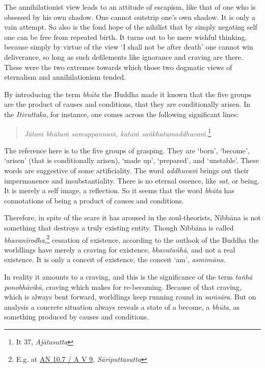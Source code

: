 The annihilationist view leads to an attitude of escapism, like that of one who is obsessed by his own shadow. One cannot outstrip one's own shadow. It is only a vain attempt. So also is the fond hope of the nihilist that by simply negating self one can be free from repeated birth. It turns out to be mere wishful thinking, because simply by virtue of the view `I shall not be after death' one cannot win deliverance, so long as such defilements like ignorance and craving are there. These were the two extremes towards which those two dogmatic views of eternalism and annihilationism tended.

By introducing the term \emph{bhūta} the Buddha made it known that the five groups are the product of causes and conditions, that they are conditionally arisen. In the \emph{Itivuttaka}, for instance, one comes across the following significant lines:

\begin{quote}
\emph{Jātaṁ bhūtaṁ samuppannaṁ, kataṁ saṅkhatamaddhuvaṁ.}\footnote{It 37, \emph{Ajātasutta}}
\end{quote}

The reference here is to the five groups of grasping. They are `born', `become', `arisen' (that is conditionally arisen), `made up', `prepared', and `unstable'. These words are suggestive of some artificiality. The word \emph{addhuvaṁ} brings out their impermanence and insubstantiality. There is no eternal essence, like \emph{sat}, or being. It is merely a self image, a reflection. So it seems that the word \emph{bhūta} has connotations of being a product of causes and conditions.

Therefore, in spite of the scare it has aroused in the soul-theorists, Nibbāna is not something that destroys a truly existing entity. Though Nibbāna is called \emph{bhavanirodha},\footnote{E.g. at \href{https://suttacentral.net/an10.7/pli/ms}{AN 10.7 / A V 9}, \emph{Sāriputtasutta}} cessation of existence, according to the outlook of the Buddha the worldlings have merely a craving for existence, \emph{bhavataṅhā}, and not a real existence. It is only a conceit of existence, the conceit `am', \emph{asmimāna}.

In reality it amounts to a craving, and this is the significance of the term \emph{taṅhā ponobhāvikā}, craving which makes for re-becoming. Because of that craving, which is always bent forward, worldlings keep running round in \emph{saṁsāra}. But on analysis a concrete situation always reveals a state of a become, a \emph{bhūta}, as something produced by causes and conditions.


